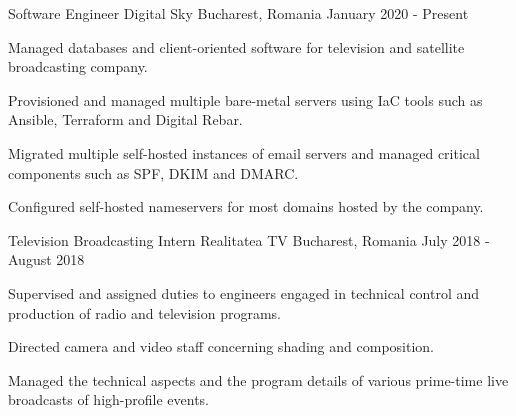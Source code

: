 \begin{cventries}
  \cventry
    {Software Engineer}
    {Digital Sky}
    {Bucharest, Romania}
    {January 2020 - Present}
    {
      \begin{cvitems}
        \item {Managed databases and client-oriented software for television and satellite broadcasting company.}
        \item {Provisioned and managed multiple bare-metal servers using IaC tools such as Ansible, Terraform and Digital Rebar.}
        \item {Migrated multiple self-hosted instances of email servers and managed critical components such as SPF, DKIM and DMARC.}
        \item {Configured self-hosted nameservers for most domains hosted by the company.}
      \end{cvitems}
    }
  \cventry
    {Television Broadcasting Intern}
    {Realitatea TV}
    {Bucharest, Romania}
    {July 2018 - August 2018}
    {
      \begin{cvitems}
        \item {Supervised and assigned duties to engineers engaged in technical control and production of radio and television programs.}
        \item {Directed camera and video staff concerning shading and composition.}
        \item {Managed the technical aspects and the program details of various prime-time live broadcasts of high-profile events.}
      \end{cvitems}
    }
\end{cventries}
